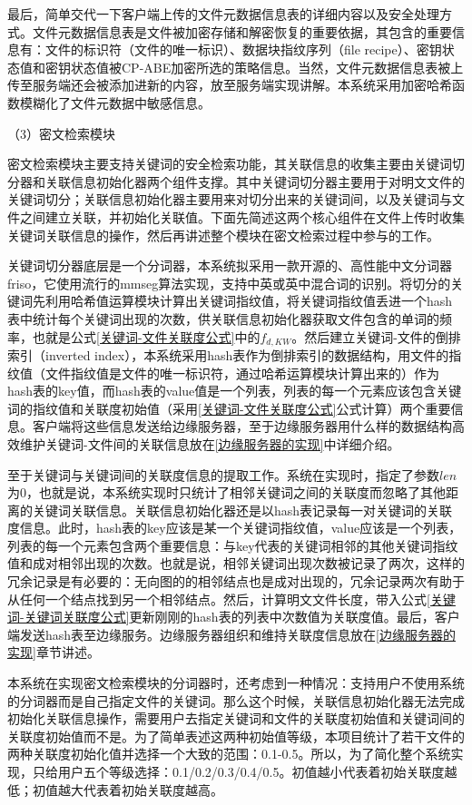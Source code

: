 \documentclass[promaster]{thesis-uestc}
\begin{document}
最后，简单交代一下客户端上传的文件元数据信息表的详细内容以及安全处理方式。文件元数据信息表是文件被加密存储和解密恢复的重要依据，其包含的重要信息有：文件的标识符（文件的唯一标识）、数据块指纹序列（file recipe）、密钥状态值和密钥状态值被CP-ABE加密所选的策略信息。当然，文件元数据信息表被上传至服务端还会被添加进新的内容，放至服务端实现讲解。本系统采用加密哈希函数模糊化了文件元数据中敏感信息。

（3）密文检索模块

密文检索模块主要支持关键词的安全检索功能，其关联信息的收集主要由关键词切分器和关联信息初始化器两个组件支撑。其中关键词切分器主要用于对明文文件的关键词切分；关联信息初始化器主要用来对切分出来的关键词间，以及关键词与文件之间建立关联，并初始化关联值。下面先简述这两个核心组件在文件上传时收集关键词关联信息的操作，然后再讲述整个模块在密文检索过程中参与的工作。

关键词切分器底层是一个分词器，本系统拟采用一款开源的、高性能中文分词器friso，它使用流行的mmseg算法实现，支持中英或英中混合词的识别。将切分的关键词先利用哈希值运算模块计算出关键词指纹值，将关键词指纹值丢进一个hash表中统计每个关键词出现的次数，供关联信息初始化器获取文件包含的单词的频率，也就是公式\ref{关键词-文件关联度公式}中的$f_{d, KW}$。然后建立关键词-文件的倒排索引（inverted index），本系统采用hash表作为倒排索引的数据结构，用文件的指纹值（文件指纹值是文件的唯一标识符，通过哈希运算模块计算出来的）作为hash表的key值，而hash表的value值是一个列表，列表的每一个元素应该包含关键词的指纹值和关联度初始值（采用\ref{关键词-文件关联度公式}公式计算）两个重要信息。客户端将这些信息发送给边缘服务器，至于边缘服务器用什么样的数据结构高效维护关键词-文件间的关联信息放在\ref{边缘服务器的实现}中详细介绍。

至于关键词与关键词间的关联度信息的提取工作。系统在实现时，指定了参数$len$为0，也就是说，本系统实现时只统计了相邻关键词之间的关联度而忽略了其他距离的关键词关联信息。关联信息初始化器还是以hash表记录每一对关键词的关联度信息。此时，hash表的key应该是某一个关键词指纹值，value应该是一个列表，列表的每一个元素包含两个重要信息：与key代表的关键词相邻的其他关键词指纹值和成对相邻出现的次数。也就是说，相邻关键词出现次数被记录了两次，这样的冗余记录是有必要的：无向图的的相邻结点也是成对出现的，冗余记录两次有助于从任何一个结点找到另一个相邻结点。然后，计算明文文件长度，带入公式\ref{关键词-关键词关联度公式}更新刚刚的hash表的列表中次数值为关联度值。最后，客户端发送hash表至边缘服务。边缘服务器组织和维持关联度信息放在\ref{边缘服务器的实现}章节讲述。

本系统在实现密文检索模块的分词器时，还考虑到一种情况：支持用户不使用系统的分词器而是自己指定文件的关键词。那么这个时候，关联信息初始化器无法完成初始化关联信息操作，需要用户去指定关键词和文件的关联度初始值和关键词间的关联度初始值而不是。为了简单表述这两种初始值等级，本项目统计了若干文件的两种关联度初始化值并选择一个大致的范围：0.1-0.5。所以，为了简化整个系统实现，只给用户五个等级选择：0.1/0.2/0.3/0.4/0.5。初值越小代表着初始关联度越低；初值越大代表着初始关联度越高。
\end{document}
